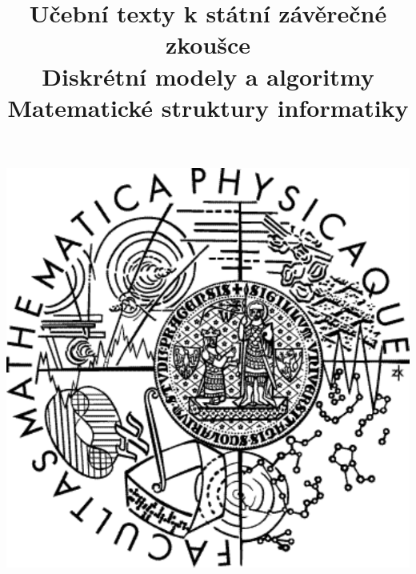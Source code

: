 \clearpage

\clearpage

\title{\LARGE Učební texty k státní závěrečné zkoušce \\ Diskrétní modely a algoritmy \\ Matematické struktury informatiky}




\maketitle

\vspace{10mm}
\begin{center}
\includegraphics[scale=0.5]{../common/logo.pdf}
\end{center} 

\clearpage

\clearpage

\tableofcontents






